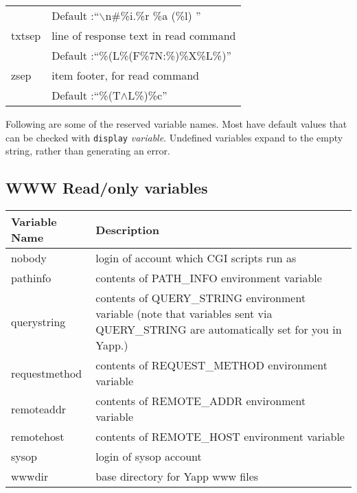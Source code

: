 \documentclass[twoside]{report}
\begin{document}
\begin{supertabular}{ll}
             & \hspace{1cm} Default :``$\backslash$n\#\%i.\%r \%a (\%l) '' \\
         txtsep &     line of response text in read command \\
             & \hspace{1cm} Default :``\%(L\%(F\%7N:\%)\%X\%L\%)'' \\
         zsep &       item footer, for read command \\
            & \hspace{1cm} Default :``\%(T$\wedge$L\%)\%c''\\
      \end{supertabular} 

      Following are some of the reserved variable names.  Most have default 
      values that can be checked with {\tt display} {\em variable}.  Undefined 
      variables expand to the empty string, rather than generating an error.

      \subsection*{WWW Read/only variables}
         \begin{tabular}{lp{4.5in}} 
         Variable Name & Description \\ \hline
         nobody\index{nobody} 
            & login of account which CGI scripts run as \\
         pathinfo\index{pathinfo}   
            & contents of PATH\_INFO environment variable\\
         querystring\index{querystring} 
            & contents of QUERY\_STRING environment variable 
              (note that variables sent via QUERY\_STRING are 
              automatically set for you in Yapp.) \\
         requestmethod\index{requestmethod}
            & contents of REQUEST\_METHOD environment variable\\
         remoteaddr\index{remoteaddr} 
            & contents of REMOTE\_ADDR environment variable\\
         remotehost\index{remotehost} 
            & contents of REMOTE\_HOST environment variable\\
         sysop\index{sysop}   &   login of sysop account\\
         wwwdir\index{wwwdir} &   base directory for Yapp www files\\ \hline
         \end{tabular}
\vspace{12pt}
\end{document}
